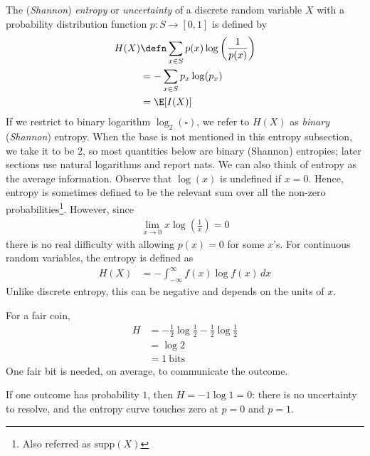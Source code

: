 \documentclass[a4paper, 12pt]{book}
\begin{document}
\begin{definition}
    The (\emph{Shannon}) \emph{entropy} or \emph{uncertainty} of a discrete random variable $X$ with a probability distribution function $p: S \longrightarrow [0,1]$ is defined by
    \begin{align}
        H(X) &\defn \sum_{x \in S} p(x) \log\left( \frac{1}{p(x)} \right)  \\
        &= -\sum_{x \in S} p_x \log(p_x) \\
        &= \E[I(X)] 
    \end{align}
    If we restrict to binary logarithm $\log_2(\square)$, we refer to $H(X)$ as \emph{binary} (\emph{Shannon}) entropy. When the base is not mentioned in this entropy subsection, we take it to be 2, so most quantities below are binary (Shannon) entropies; later sections use natural logarithms and report nats. We can also think of entropy as the average information. Observe that $\log(x)$ is undefined if $x = 0$. Hence, entropy is sometimes defined to be the relevant sum over all the non-zero probabilities\footnote{Also referred as $\mathrm{supp}(X)$}. However, since
        \begin{align}
        \lim_{x \longrightarrow 0} x \log\left( \frac{1}{x} \right) = 0
    \end{align}
    there is no real difficulty with allowing $p(x) = 0$ for some $x$'s. For continuous random variables, the entropy is defined as
    \begin{align}
        H(X) &= -\int_{-\infty}^{\infty} f(x) \log f(x) \, dx
    \end{align}
    Unlike discrete entropy, this can be negative and depends on the units of $x$. 
\end{definition}
\begin{example}
    For a fair coin,
    \begin{align}
        H &= -\frac{1}{2}\log\frac{1}{2}-\frac{1}{2}\log\frac{1}{2} \\
        &=\log 2 \\
        &= 1~\text{bits}
    \end{align}
    One fair bit is needed, on average, to communicate the outcome.
\end{example}

\begin{example}
    If one outcome has probability $1$, then $H=-1\log 1=0$: there is no uncertainty to resolve, and the entropy curve touches zero at $p=0$ and $p=1$.
\end{example}
\end{document}

